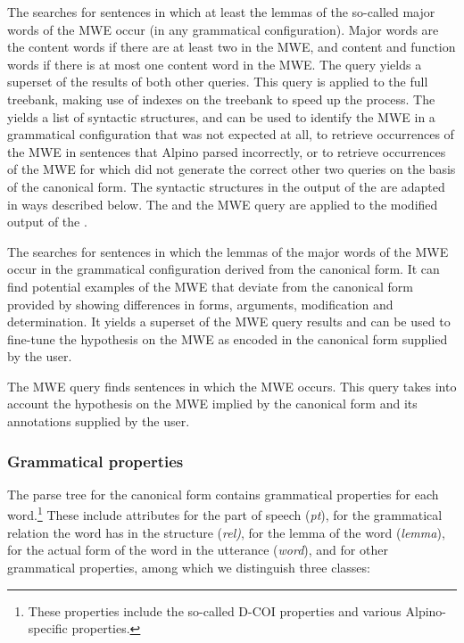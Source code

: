 \documentclass[output=paper,colorlinks,citecolor=brown]{langscibook}
\begin{document}
The {\supersetquery} searches for sentences in which at least the lemmas of the so-called major words of the MWE occur (in any grammatical configuration). Major words are the content words if there are at least two in the MWE, and content and function words if there is at most one content word in the MWE. The query yields a superset of the results of both other queries. This query is applied to the full treebank, making use of indexes on the treebank to speed up the process. The {\supersetquery} yields a list of syntactic structures, and can be used to identify the MWE in a grammatical configuration that was not expected at all, to retrieve occurrences of the MWE in sentences  that Alpino parsed incorrectly, or to retrieve occurrences of the MWE for which {\mwefinder} did not generate the correct other two queries on the basis of the canonical form. The syntactic structures in the output of the {\supersetquery} are adapted in ways described below. The {\nearmissquery} and the MWE query are applied to the modified output of the {\supersetquery}.

The {\nearmissquery} searches for sentences in which the lemmas of the major words of the MWE occur in the grammatical configuration derived from the canonical form. It can find potential examples of the MWE that deviate from the canonical form provided by showing differences in forms, arguments, modification and determination. It yields a superset of the MWE query results and can be used to fine-tune the hypothesis on the MWE as encoded in the canonical form supplied by the user.

The {MWE query} finds sentences in which the MWE occurs. This query takes into account the hypothesis on the MWE implied by the canonical form and its annotations supplied by the user.

\subsubsection{Grammatical properties}
\label{gramprops}

The parse tree for the canonical form contains grammatical properties for each word.\footnote{These properties include the so-called D-COI properties \citep{VanEynde:DCOITagSet:2005} and various Alpino-specific properties.} These include attributes for the part of speech (\textit{pt}), for the grammatical relation the word has in the structure (\textit{rel)}, for the lemma of the word (\textit{lemma}), for the actual form of the word in the utterance (\textit{word}), and for other grammatical properties, among which we distinguish three classes:
\end{document}
